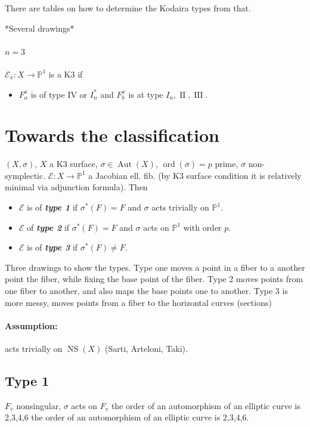 	There are tables on how to determine the Kodaira types from that.

*Several drawings*

\paragraph{$n=3$} $\mathcal{E}_{x}:X\to \mathbb{P}^1$ is a K3 if
\begin{itemize}
\item $F_a^x$ is of type IV or $I^*_n$ and $F^x_b$ is at type $I_n, \operatorname{I I},\operatorname{I I I }$.
\end{itemize}

\section{Towards the classification}

\begin{defn}
$(X,\sigma)$, $X$ a K3 surface, $\sigma\in\operatorname{Aut}(X)$, $\operatorname{ord}(\sigma)=p$ prime, $\sigma$ non-symplectic. $\mathcal{E}:X\to \mathbb{P}^1$ a Jacobian ell. fib. (by K3 surface condition it is relatively minimal via adjunction formula). Then

\begin{itemize}
\item $\mathcal{E}$ is of \textit{\textbf{type 1}} if $\sigma^*(F)=F$ and $\sigma$ acts trivially on $\mathbb{P}^1$.
\item $\mathcal{E}$ of \textit{\textbf{type 2}} if  $\sigma^*(F)=F$ and $\sigma$ acts on $\mathbb{P}^1$ with order $p$.
\item $\mathcal{E}$ is of \textit{\textbf{type 3}} if $\sigma^*(F)\neq F$.
\end{itemize}
\end{defn}

Three drawings to show the types. Type one moves a point in a fiber to a another point the fiber, while fixing the base point of the fiber. Type 2 moves points from one fiber to another, and also maps the base points one to another. Type 3 is more messy, moves points from a fiber to the horizontal curves (sections)

\paragraph{Assumption:} acts trivially on $\operatorname{NS}(X)$ (Sarti, Arteloni, Taki).

\subsection{Type 1}
$F_v$ nonsingular, $\sigma$ acts on $F_v$ the order of an automorphism of an elliptic curve is 2,3,4,6 the order of an automorphism of an elliptic curve is 2,3,4,6.

